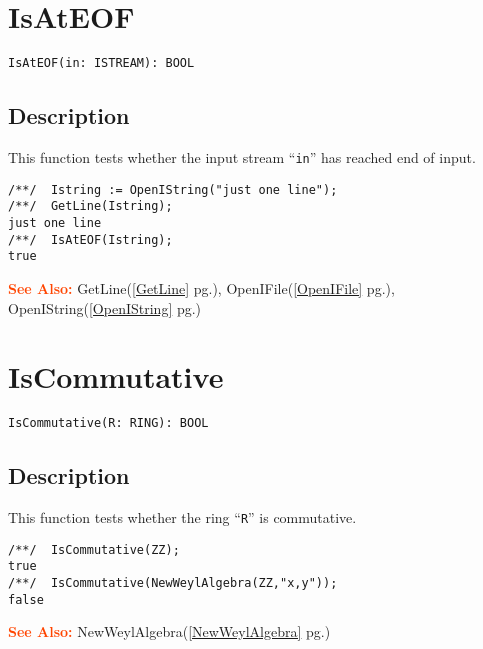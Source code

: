 \documentclass[a4paper]{mybook}
\newenvironment{command}{}{} %
\newcommand\SeeAlso{\par\textcolor{OrangeRed}{\textbf{\large See Also: }}}
\begin{document}
\section{IsAtEOF}
\label{IsAtEOF}
\begin{command} %


\begin{Verbatim}[label=syntax, rulecolor=\color{MidnightBlue},
frame=single]
IsAtEOF(in: ISTREAM): BOOL 
\end{Verbatim}


\subsection*{Description}

This function tests whether the input stream ``\verb&in&'' has reached end of input.
\begin{Verbatim}[label=example, rulecolor=\color{PineGreen}, frame=single]
/**/  Istring := OpenIString("just one line");
/**/  GetLine(Istring);
just one line
/**/  IsAtEOF(Istring);
true
\end{Verbatim}


\SeeAlso %
  GetLine(\ref{GetLine} pg.\pageref{GetLine}), 
    OpenIFile(\ref{OpenIFile} pg.\pageref{OpenIFile}), 
    OpenIString(\ref{OpenIString} pg.\pageref{OpenIString})
\end{command} %

\section{IsCommutative}
\label{IsCommutative}
\begin{command} %


\begin{Verbatim}[label=syntax, rulecolor=\color{MidnightBlue},
frame=single]
IsCommutative(R: RING): BOOL
\end{Verbatim}


\subsection*{Description}

This function tests whether the ring ``\verb&R&'' is commutative.
\begin{Verbatim}[label=example, rulecolor=\color{PineGreen}, frame=single]
/**/  IsCommutative(ZZ);
true
/**/  IsCommutative(NewWeylAlgebra(ZZ,"x,y"));
false
\end{Verbatim}


\SeeAlso %
  NewWeylAlgebra(\ref{NewWeylAlgebra} pg.\pageref{NewWeylAlgebra})
\end{command} %
\end{document}
